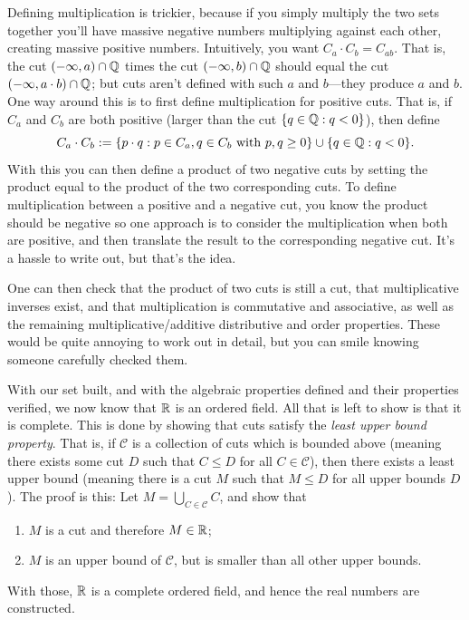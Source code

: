 \documentclass[11pt,twoside=off,numbers=noenddot]{scrbook}
\begin{document}
\begin{proofsketch}
  Defining multiplication is trickier, because if you simply multiply
  the two sets together you'll have massive negative numbers
  multiplying against each other, creating massive positive numbers.
  Intuitively, you want $C_a \cdot C_b = C_{ab}$. That is, the cut
  $(-\infty, a) \cap \mathbb Q$ times the cut $(-\infty, b) \cap \mathbb Q$
  should equal the cut $(-\infty, a \cdot b) \cap \mathbb Q$; but cuts
  aren't defined with such $a$ and $b$—they produce $a$ and $b$. One
  way around this is to first define multiplication for positive
  cuts. That is, if $C_a$ and $C_b$ are both positive (larger than
  the cut $\{ q \in \mathbb Q : q < 0 \}$), then define
  \[ C_a \cdot C_b := \{ p \cdot q : p \in C_a, q \in C_b \text{
  with } p, q \geq 0 \} \cup \{ q \in \mathbb Q : q < 0 \}. \]
  With this you can then define a product of two negative cuts by
  setting the product equal to the product of the two corresponding
  cuts. To define multiplication between a positive and a negative
  cut, you know the product should be negative so one approach is to
  consider the multiplication when both are positive, and then
  translate the result to the corresponding negative cut. It's a
  hassle to write out, but that's the idea.

  One can then check that the product of two cuts is still a cut,
  that multiplicative inverses exist, and that multiplication is
  commutative and associative, as well as the remaining
  multiplicative/additive distributive and order properties. These
  would be quite annoying to work out in detail, but you can smile
  knowing someone carefully checked them.

  With our set built, and with the algebraic properties defined and
  their properties verified, we now know that $\mathbb R$ is an ordered
  field. All that is left to show is that it is complete. This is
  done by showing that cuts satisfy the \textit{least upper bound
  property}. That is, if $\mathcal{C}$ is a collection of cuts which
  is bounded above (meaning there exists some cut $D$ such that $C
  \leq D$ for all $C \in \mathcal{C}$), then there exists a least
  upper bound (meaning there is a cut $M$ such that $M \leq D$ for
  all upper bounds $D$). The proof is this: Let $M = \bigcup_{C \in
  \mathcal{C}} C$, and show that
  \begin{enumerate}
    \item $M$ is a cut and therefore $M \in \mathbb R$;
    \item $M$ is an upper bound of $\mathcal{C}$, but is smaller than
      all other upper bounds.
  \end{enumerate}
  With those, $\mathbb R$ is a complete ordered field, and hence the real
  numbers are constructed.
\end{proofsketch}
\end{document}
